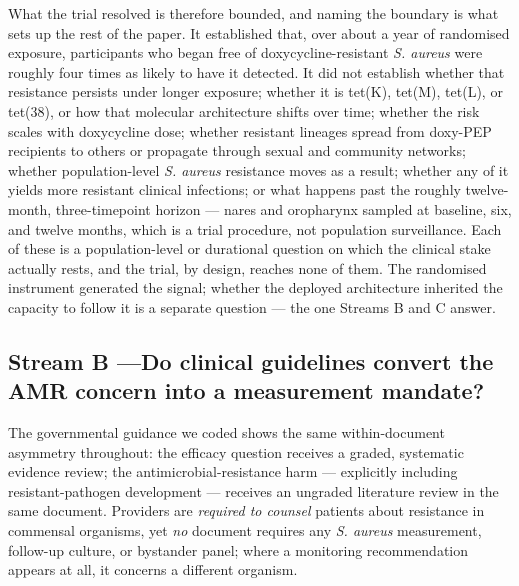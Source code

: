 \documentclass[10pt,letterpaper]{article}
\begin{document}
What the trial resolved is therefore bounded, and naming the boundary is
what sets up the rest of the paper. It established that, over about a
year of randomised exposure, participants who began free of
doxycycline-resistant \emph{S. aureus} were roughly four times as likely
to have it detected. It did not establish whether that resistance
persists under longer exposure; whether it is tet(K), tet(M), tet(L), or
tet(38), or how that molecular architecture shifts over time; whether
the risk scales with doxycycline dose; whether resistant lineages spread
from doxy-PEP recipients to others or propagate through sexual and
community networks; whether population-level \emph{S. aureus} resistance
moves as a result; whether any of it yields more resistant clinical
infections; or what happens past the roughly twelve-month,
three-timepoint horizon --- nares and oropharynx sampled at baseline,
six, and twelve months, which is a trial procedure, not population
surveillance. Each of these is a population-level or durational question
on which the clinical stake actually rests, and the trial, by design,
reaches none of them. The randomised instrument generated the signal;
whether the deployed architecture inherited the capacity to follow it is
a separate question --- the one Streams B and C answer.

\subsection*{Stream B ---Do clinical guidelines convert the AMR concern into a measurement mandate?}

The governmental guidance we coded shows the same within-document
asymmetry throughout: the efficacy question receives a graded,
systematic evidence review; the antimicrobial-resistance harm ---
explicitly including resistant-pathogen development --- receives an
ungraded literature review in the same document. Providers are
\emph{required to counsel} patients about resistance in commensal
organisms, yet \emph{no} document requires any \emph{S. aureus}
measurement, follow-up culture, or bystander panel; where a monitoring
recommendation appears at all, it concerns a different organism.
\end{document}
